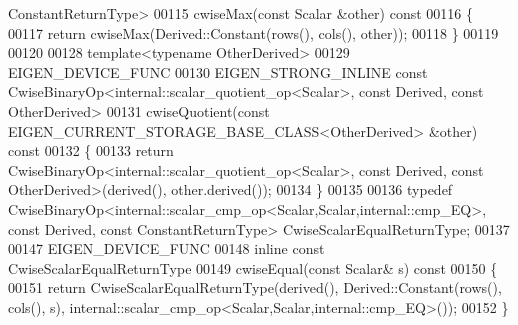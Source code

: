 \begin{DoxyCode}
      ConstantReturnType>
00115 cwiseMax(\textcolor{keyword}{const} Scalar &other)\textcolor{keyword}{ const}
00116 \textcolor{keyword}{}\{
00117   \textcolor{keywordflow}{return} cwiseMax(Derived::Constant(rows(), cols(), other));
00118 \}
00119 
00120 
00128 \textcolor{keyword}{template}<\textcolor{keyword}{typename} OtherDerived>
00129 EIGEN\_DEVICE\_FUNC
00130 EIGEN\_STRONG\_INLINE \textcolor{keyword}{const} CwiseBinaryOp<internal::scalar\_quotient\_op<Scalar>, \textcolor{keyword}{const} Derived, \textcolor{keyword}{const} 
      OtherDerived>
00131 cwiseQuotient(\textcolor{keyword}{const} EIGEN\_CURRENT\_STORAGE\_BASE\_CLASS<OtherDerived> &other)\textcolor{keyword}{ const}
00132 \textcolor{keyword}{}\{
00133   \textcolor{keywordflow}{return} CwiseBinaryOp<internal::scalar\_quotient\_op<Scalar>, \textcolor{keyword}{const} Derived, \textcolor{keyword}{const} OtherDerived>(derived(), 
      other.derived());
00134 \}
00135 
00136 \textcolor{keyword}{typedef} CwiseBinaryOp<internal::scalar\_cmp\_op<Scalar,Scalar,internal::cmp\_EQ>, \textcolor{keyword}{const} Derived, \textcolor{keyword}{const} 
      ConstantReturnType> CwiseScalarEqualReturnType;
00137 
00147 EIGEN\_DEVICE\_FUNC
00148 \textcolor{keyword}{inline} \textcolor{keyword}{const} CwiseScalarEqualReturnType
00149 cwiseEqual(\textcolor{keyword}{const} Scalar& s)\textcolor{keyword}{ const}
00150 \textcolor{keyword}{}\{
00151   \textcolor{keywordflow}{return} CwiseScalarEqualReturnType(derived(), Derived::Constant(rows(), cols(), s), 
      internal::scalar\_cmp\_op<Scalar,Scalar,internal::cmp\_EQ>());
00152 \}
\end{DoxyCode}
